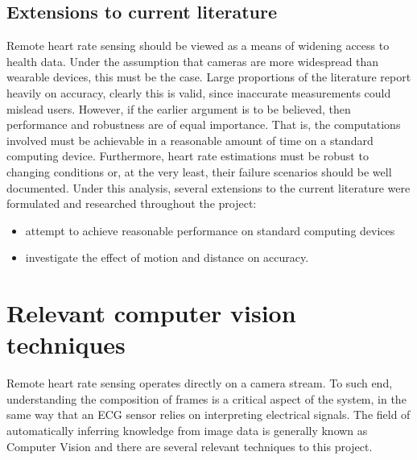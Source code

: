 \subsection{Extensions to current literature}
Remote heart rate sensing should be viewed as a means of widening access to health data. Under the assumption that cameras are more widespread than wearable devices, this must be the case.
Large proportions of the literature report heavily on accuracy, clearly this is valid, since inaccurate measurements could mislead users. However, if the earlier argument is to be believed, then 
performance and robustness are of equal importance. That is, the computations involved must be achievable in a reasonable amount of time on a standard computing device. 
Furthermore, heart rate estimations must be robust to changing conditions or, at the very least, their failure scenarios should be well documented. 
Under this analysis, several extensions to the current literature were formulated and researched throughout the project:
\begin{itemize}
    \item attempt to achieve reasonable performance on standard computing devices
    \item investigate the effect of motion and distance on accuracy.
\end{itemize}


\section{Relevant computer vision techniques}
Remote heart rate sensing operates directly on a camera stream. To such end, understanding the composition of frames is a critical 
aspect of the system, in the same way that an ECG sensor relies on interpreting electrical signals. 
The field of automatically inferring knowledge from image data is generally known as Computer Vision and there are several relevant techniques to this project.

